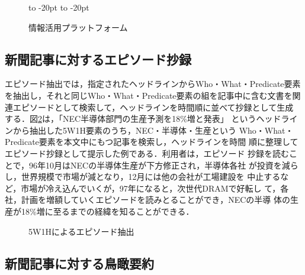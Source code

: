 \begin{figure}[tbp]
\vspace{-0.45cm}
  \vspace*{-6pt}
  \begin{center}
    \leavevmode
    \hbox to -20pt{\hss}
    \hbox to -20pt{\hss}
\vspace*{-17pt}
    \caption{情報活用プラットフォーム}
   \vspace*{-6pt}
    \label{fig:plat}
  \end{center}
\end{figure}
\vspace{0.5cm}

\subsection{新聞記事に対するエピソード抄録}

エピソード抽出では，指定されたヘッドラインからWho・What・Predicate要素
を抽出し，それと同じWho・What・Predicate要素の組を記事中に含む文書を関
連エピソードとして検索して，ヘッドラインを時間順に並べて抄録として生成
する．図\ref{fig:episode}は，「NEC半導体部門の生産予測を18\%増と発表」
というヘッドラインから抽出した5W1H要素のうち，NEC・半導体・生産という
Who・What・Predicate要素を本文中にもつ記事を検索し，ヘッドラインを時間
順に整理してエピソード抄録として提示した例である．利用者は，エピソード
抄録を読むことで，96年10月はNECの半導体生産が下方修正され，半導体各社
が投資を減らし，世界規模で市場が減となり，12月には他の会社が工場建設を
中止するなど，市場が冷え込んでいくが，97年になると，次世代DRAMで好転し
て，各社，計画を増額していくエピソードを読みとることができ，NECの半導
体の生産が18\%増に至るまでの経緯を知ることができる．

\begin{figure}[tbp]
  \vspace*{-6pt}
  \begin{center}
    \leavevmode
    \vspace*{-2pt}
 
    \caption{5W1Hによるエピソード抽出}
    \vspace*{-6pt}
    \label{fig:episode}
  \end{center}
\end{figure}

\vspace{-0.cm}

\subsection{新聞記事に対する鳥瞰要約}

